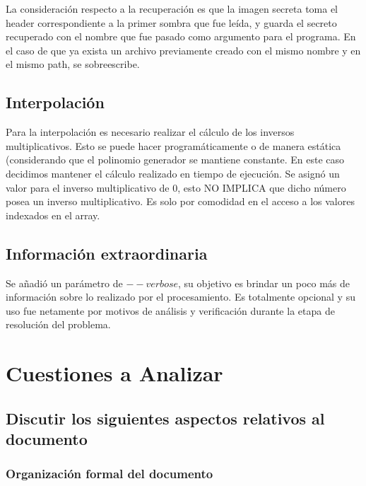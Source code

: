 \documentclass[11pt]{scrartcl} %
\begin{document}
La consideración respecto a la recuperación es que la imagen secreta toma el header correspondiente a la primer sombra que fue leída, y guarda el secreto recuperado con el nombre que fue pasado como argumento para el programa. En el caso de que ya exista un archivo previamente creado con el mismo nombre y en el mismo path, se sobreescribe.

\subsection{Interpolación}

Para la interpolación es necesario realizar el cálculo de los inversos multiplicativos. Esto se puede hacer programáticamente o de manera estática (considerando que el polinomio generador se mantiene constante. En este caso decidimos mantener el cálculo realizado en tiempo de ejecución. Se asignó un valor para el inverso multiplicativo de 0, esto NO IMPLICA que dicho número posea un inverso multiplicativo. Es solo por comodidad en el acceso a los valores indexados en el array.

\subsection{Información extraordinaria}

Se añadió un parámetro de $--verbose$, su objetivo es brindar un poco más de información sobre lo realizado por el procesamiento. Es totalmente opcional y su uso fue netamente por motivos de análisis y verificación durante la etapa de resolución del problema.




\section{Cuestiones a Analizar}

\subsection{Discutir los siguientes aspectos relativos al documento}

\subsubsection{Organización formal del documento}
\end{document}
